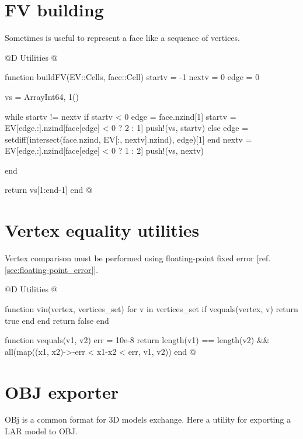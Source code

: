 \section{FV building}

Sometimes is useful to represent a face like a sequence of vertices.

@D Utilities
@{function buildFV(EV::Cells, face::Cell)
    startv = -1
    nextv = 0
    edge = 0

    vs = Array{Int64, 1}()

    while startv != nextv
        if startv < 0
            edge = face.nzind[1]
            startv = EV[edge,:].nzind[face[edge] < 0 ? 2 : 1]
            push!(vs, startv)
        else
            edge = setdiff(intersect(face.nzind, EV[:, nextv].nzind), edge)[1]
        end
        nextv = EV[edge,:].nzind[face[edge] < 0 ? 1 : 2]
        push!(vs, nextv)

    end

    return vs[1:end-1]
end
@}



\section{Vertex equality utilities}
\label{sec:vertex_equality}

Vertex comparison must be performed using 
floating-point fixed error 
[ref. \ref{sec:floating-point_error}].

@D Utilities
@{function vin(vertex, vertices_set)
    for v in vertices_set
        if vequals(vertex, v)
            return true
        end
    end
    return false
end

function vequals(v1, v2)
    err = 10e-8
    return length(v1) == length(v2) && all(map((x1, x2)->-err < x1-x2 < err, v1, v2))
end
@}

\section{OBJ exporter}

OBj is a common format for 3D models exchange. Here a utility for exporting
a LAR model to OBJ.

